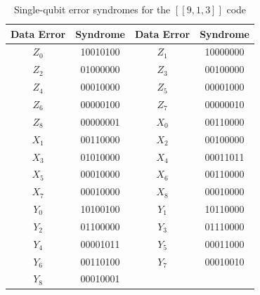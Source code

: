 \documentclass[reprint, amsmath,amssymb, aps,pra,
 floatfix,
]{revtex4-2}
\newcommand{\PadCell}[1]{\kern8pt#1\kern8pt}
\newcommand{\PadCellColor}[2]{\cellcolor{#1}\kern8pt#2\kern8pt}
\begin{document}
\begin{table}[h]
\centering
\scriptsize
  \setlength{\tabcolsep}{0pt} %
  \renewcommand{\arraystretch}{1.4} %

  \begin{tabular}{|c|c|c|c|}
    \hline
    \textbf{Data Error}  & \textbf{ Syndrome } & \textbf{ Data Error } & \textbf{ Syndrome } \\ \hline


    \rowcolor{gray!10}
    $Z_0$  & 10010100  & $Z_1$    &  10000000      \\ \hline
    $Z_2$  & 01000000  & $Z_3$    &  00100000      \\ \hline

    \rowcolor{gray!10}
    $Z_4$  & 00010000  & $Z_5$    &  00001000      \\ \hline
    $Z_6$  & 00000100  & $Z_7$    &  00000010      \\ \hline

    \rowcolor{gray!10}
    $Z_8$  & 00000001  & $X_0$    &  00110000      \\ \hline
    $X_1$  & 00110000  & $X_2$    &  00100000      \\ \hline

    \rowcolor{gray!10}
    $X_3$  & 01010000  & $X_4$    & 00011011       \\ \hline
    $X_5$  & 00010000  & $X_6$    &  00110000     \\ \hline

    \rowcolor{gray!10}
    $X_7$  & 00010000  & $X_8$    &  00010000      \\ \hline
    $Y_0$  & 10100100  & $Y_1$    &  10110000      \\ \hline

    \rowcolor{gray!10}
    $Y_2$  & 01100000  & $Y_3$    &  01110000      \\ \hline
    $Y_4$  & 00001011  & $Y_5$    &  00011000     \\ \hline

    \rowcolor{gray!10}
    $Y_6$  & 00110100  & $Y_7$    &   00010010     \\ \hline
    $Y_8$  & 00010001  &     &        \\ \hline


   

  \end{tabular}
\caption{Single-qubit error syndromes for the $[[9,1,3]]$ code}
\label{tab:errors_due_to_faults_9}
\end{table}
\end{document}
